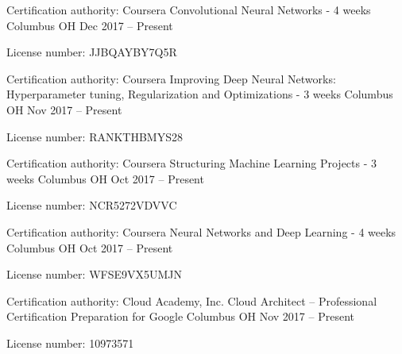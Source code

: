 \vspace{-3mm}
\begin{cventries}
 \vspace{-1mm}  \cventry
    {Certification authority: Coursera }
    {Convolutional Neural Networks - 4 weeks }
    {Columbus OH}
    {Dec 2017 – Present}
    {\begin{cvitems}\item {License number: JJBQAYBY7Q5R}     
      \end{cvitems}   \vspace{-4mm} 
    }
\cventry
    {Certification authority: Coursera }
    {Improving Deep Neural Networks: Hyperparameter tuning, Regularization and Optimizations - 3 weeks }
    {Columbus OH}
    {Nov 2017 – Present}
    {\begin{cvitems}\item {License number: RANKTHBMYS28}     
      \end{cvitems}   \vspace{-4mm} 
    }
\cventry
    {Certification authority: Coursera }
    {Structuring Machine Learning Projects - 3 weeks}
    {Columbus OH}
    {Oct 2017 – Present}
    {\begin{cvitems}\item {License number: NCR5272VDVVC}     
      \end{cvitems}   \vspace{-4mm} 
    } 
\cventry
    {Certification authority: Coursera }
    {Neural Networks and Deep Learning - 4 weeks }
    {Columbus OH}
    {Oct 2017 – Present}
    {\begin{cvitems}\item {License number:  WFSE9VX5UMJN}     
      \end{cvitems}   \vspace{-4mm} 
    } 
 \cventry    
    {Certification authority: Cloud Academy, Inc.}
    {Cloud Architect – Professional Certification Preparation for Google}
    {Columbus OH}
    {Nov 2017 – Present}
    {
   \begin{cvitems}
        \item {License number: 10973571 }
        \end{cvitems}} 
\end{cventries}
